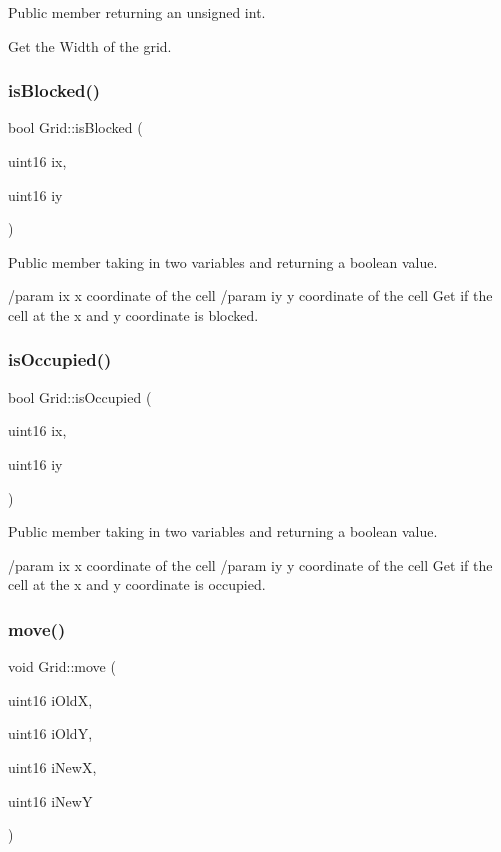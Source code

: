 Public member returning an unsigned int. 

Get the Width of the grid. \hypertarget{class_grid_a8f12a73036cc2f155e20030dfae6b6f6}{}\label{class_grid_a8f12a73036cc2f155e20030dfae6b6f6} 
\subsubsection{\texorpdfstring{is\+Blocked()}{isBlocked()}}
{\footnotesize\ttfamily bool Grid\+::is\+Blocked (\begin{DoxyParamCaption}\item[{uint16}]{ix,  }\item[{uint16}]{iy }\end{DoxyParamCaption})}



Public member taking in two variables and returning a boolean value. 

/param ix x coordinate of the cell /param iy y coordinate of the cell Get if the cell at the x and y coordinate is blocked. \hypertarget{class_grid_afbfece3a3d96fa4e40316ad9cdf61c98}{}\label{class_grid_afbfece3a3d96fa4e40316ad9cdf61c98} 
\subsubsection{\texorpdfstring{is\+Occupied()}{isOccupied()}}
{\footnotesize\ttfamily bool Grid\+::is\+Occupied (\begin{DoxyParamCaption}\item[{uint16}]{ix,  }\item[{uint16}]{iy }\end{DoxyParamCaption})}



Public member taking in two variables and returning a boolean value. 

/param ix x coordinate of the cell /param iy y coordinate of the cell Get if the cell at the x and y coordinate is occupied. \hypertarget{class_grid_af15e440bc92017e805740db43a09c034}{}\label{class_grid_af15e440bc92017e805740db43a09c034} 
\subsubsection{\texorpdfstring{move()}{move()}}
{\footnotesize\ttfamily void Grid\+::move (\begin{DoxyParamCaption}\item[{uint16}]{i\+OldX,  }\item[{uint16}]{i\+OldY,  }\item[{uint16}]{i\+NewX,  }\item[{uint16}]{i\+NewY }\end{DoxyParamCaption})}



